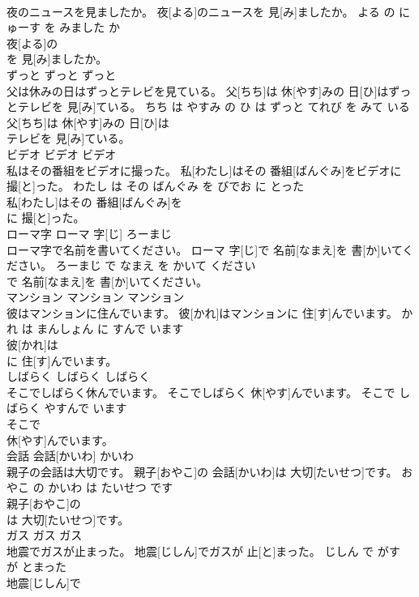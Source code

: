 \documentclass[8pt]{extreport}
\begin{document}
\begin{CJK}{UTF8}{min}
\\	夜のニュースを見ましたか。	夜[よる]のニュースを 見[み]ましたか。	よる の にゅーす を みました か	
\\	夜[よる]の
\\	を 見[み]ましたか。			
\\	ずっと	ずっと	ずっと	
\\	父は休みの日はずっとテレビを見ている。	父[ちち]は 休[やす]みの 日[ひ]はずっとテレビを 見[み]ている。	ちち は やすみ の ひ は ずっと てれび を みて いる	
\\	父[ちち]は 休[やす]みの 日[ひ]は
\\	テレビを 見[み]ている。			
\\	ビデオ	ビデオ	ビデオ	
\\	私はその番組をビデオに撮った。	私[わたし]はその 番組[ばんぐみ]をビデオに 撮[と]った。	わたし は その ばんぐみ を びでお に とった	
\\	私[わたし]はその 番組[ばんぐみ]を
\\	に 撮[と]った。			
\\	ローマ字	ローマ 字[じ]	ろーまじ	
\\	ローマ字で名前を書いてください。	ローマ 字[じ]で 名前[なまえ]を 書[か]いてください。	ろーまじ で なまえ を かいて ください	
\\	で 名前[なまえ]を 書[か]いてください。			
\\	マンション	マンション	マンション	
\\	彼はマンションに住んでいます。	彼[かれ]はマンションに 住[す]んでいます。	かれ は まんしょん に すんで います	
\\	彼[かれ]は
\\	に 住[す]んでいます。			
\\	しばらく	しばらく	しばらく	
\\	そこでしばらく休んでいます。	そこでしばらく 休[やす]んでいます。	そこで しばらく やすんで います	
\\	そこで
\\	休[やす]んでいます。			
\\	会話	会話[かいわ]	かいわ	
\\	親子の会話は大切です。	親子[おやこ]の 会話[かいわ]は 大切[たいせつ]です。	おやこ の かいわ は たいせつ です	
\\	親子[おやこ]の
\\	は 大切[たいせつ]です。			
\\	ガス	ガス	ガス	
\\	地震でガスが止まった。	地震[じしん]でガスが 止[と]まった。	じしん で がす が とまった	
\\	地震[じしん]で

\end{CJK}
\end{document}
